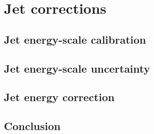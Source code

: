  \section{Jet corrections}
 \subsection{Jet energy-scale calibration}
 
  \subsection{Jet energy-scale uncertainty}
  
 \subsection{Jet energy correction}
 
 \subsection{Conclusion}
%
